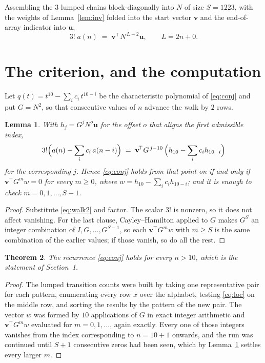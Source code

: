 \documentclass[11pt,a4paper]{article}
\theoremstyle{plain}
\newtheorem{theorem}{Theorem}
\newtheorem{lemma}[theorem]{Lemma}
\theoremstyle{definition}
\begin{document}
Assembling the $3$ lumped chains block-diagonally into $N$ of size $S=1223$, with the
weights of Lemma~\ref{lem:inv} folded into the start vector $\mathbf{v}$ and the
end-of-array indicator into $\mathbf{u}$,
\begin{equation}\label{eq:walk2}
3!\;a(n)\;=\;\mathbf{v}^{\!\top}N^{\,L-2}\mathbf{u},\qquad L=2n+0 .
\end{equation}

\section{The criterion, and the computation}

Let $q(t)=t^{10}-\sum_i c_i\,t^{10-i}$ be the characteristic polynomial of
\eqref{eq:conj} and put $G=N^{2}$, so that consecutive values of $n$ advance the
walk by $2$ rows.

\begin{lemma}\label{lem:crit}
With $h_j=G^{j}N^{o}\mathbf{u}$ for the offset $o$ that aligns the first admissible
index,
\[
3!\Bigl(a(n)-\sum_i c_i\,a(n-i)\Bigr)\;=\;\mathbf{v}^{\!\top}G^{\,j-10}\,
\Bigl(h_{10}-\sum_i c_i h_{10-i}\Bigr)
\]
for the corresponding $j$. Hence \eqref{eq:conj} holds from that point on if and only if
$\mathbf{v}^{\!\top}G^{m}w=0$ for every $m\ge0$, where
$w=h_{10}-\sum_i c_ih_{10-i}$; and it is enough to check $m=0,1,\dots,S-1$.
\end{lemma}

\begin{proof}
Substitute \eqref{eq:walk2} and factor. The scalar $3!$ is nonzero, so it does not
affect vanishing. For the last clause, Cayley--Hamilton applied to $G$ makes $G^{S}$ an
integer combination of $I,G,\dots,G^{S-1}$, so each $\mathbf{v}^{\!\top}G^{m}w$ with
$m\ge S$ is the same combination of the earlier values; if those vanish, so do all the rest.
\end{proof}

\begin{theorem}
The recurrence \eqref{eq:conj} holds for every $n>10$, which is the statement of
Section~1.
\end{theorem}

\begin{proof}
The lumped transition counts were built by taking one representative pair for each pattern,
enumerating every row $x$ over the alphabet, testing \eqref{eq:loc} on the middle
row, and sorting the results by the pattern of the new pair. The vector $w$ was formed by
$10$ applications of $G$ in exact integer arithmetic and $\mathbf{v}^{\!\top}G^{m}w$
evaluated for $m=0,1,\dots$, again exactly. Every one of those integers vanishes from the
index corresponding to $n=10+1$ onwards, and the run was continued until $S+1$
consecutive zeros had been seen, which by Lemma~\ref{lem:crit} settles every larger $m$.
\end{proof}
\end{document}
